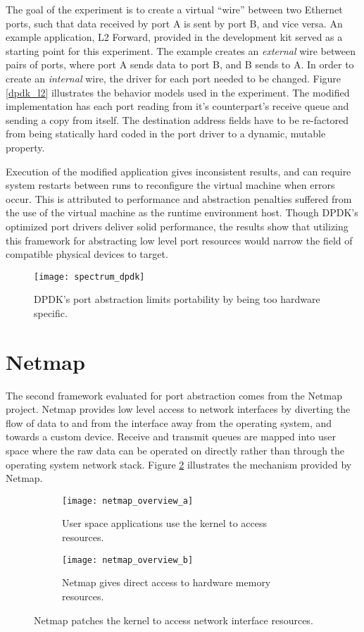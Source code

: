 The goal of the experiment is to create a virtual ``wire'' between two Ethernet
ports, such that data received by port A is sent by port B, and vice versa. An
example application, L2 Forward, provided in the development kit served as a
starting point for this experiment. The example creates an \emph{external}
wire between pairs of ports, where port A sends data to port B, and B sends to
A. In order to create an \emph{internal} wire, the driver for each port needed
to be changed. Figure \ref{dpdk_l2} illustrates the behavior models used in the
experiment. The modified implementation has each port reading from it's
counterpart's receive queue and sending a copy from itself.  The destination
address fields have to be re-factored from being statically hard coded in the
port driver to a dynamic, mutable property.

Execution of the modified application gives inconsistent results, and can
require system restarts between runs to reconfigure the virtual machine when
errors occur. This is attributed to performance and abstraction penalties
suffered from the use of the virtual machine as the runtime environment host.
Though DPDK's optimized port drivers deliver solid performance,
the results show that utilizing this framework for abstracting low level port
resources would narrow the field of compatible physical devices to target.

\begin{figure}[h!]
  \centering
  \texttt{[image: spectrum\_dpdk]}
  \caption{DPDK's port abstraction limits portability by being too hardware
  specific.}
  \label{hardware:spectrum_dpdk}
\end{figure}

\section{Netmap}
\label{hardware:netmap}
The second framework evaluated for port abstraction comes from the Netmap
project. Netmap provides low level access to network interfaces by diverting
the flow of data to and from the interface away from the operating system, and
towards a custom device. Receive and transmit queues are mapped into user space
where the raw data can be operated on directly rather than through the operating
system network stack. Figure \ref{hardware:netmap_overview} illustrates the
mechanism provided by Netmap.

\begin{figure}[h!]
  \centering
  \begin{subfigure}[b]{0.48\textwidth}
    \centering
    \texttt{[image: netmap\_overview\_a]}
    \caption{User space applications use the kernel to access resources.}
  \end{subfigure}
  \hfill
  \begin{subfigure}[b]{0.48\textwidth}
    \centering
    \texttt{[image: netmap\_overview\_b]}
    \caption{Netmap gives direct access to hardware memory resources.}
  \end{subfigure}
  \caption{Netmap patches the kernel to access network interface resources.}
  \label{hardware:netmap_overview}
\end{figure}

